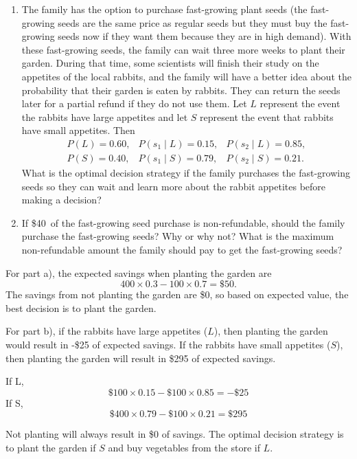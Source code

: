 \begin{enumerate}
\begin{enumerate}
    \item The family has the option to purchase fast-growing plant seeds (the fast-growing seeds are the same price as regular seeds but they must buy the fast-growing seeds now if they want them because they are in high demand).  With these fast-growing seeds, the family can wait three more weeks to plant their garden. During that time, some scientists will finish their study on the appetites of the local rabbits, and the family will have a better idea about the probability that their garden is eaten by rabbits. They can return the seeds later for a partial refund if they do not use them.
    Let $L$ represent the event the rabbits have large appetites and let $S$ represent
    the event that rabbits have small appetites. Then
    \[
    \begin{matrix}
    P(L)=0.60, & P(s_1 \mid L)=0.15, & P(s_2 \mid L)=0.85,\\
    P(S)=0.40, & P(s_1 \mid S)=0.79, & P(s_2 \mid S)=0.21.
    \end{matrix}
    \]
    What is the optimal decision strategy if the family purchases the fast-growing seeds so they can wait and learn more about the rabbit appetites before making a decision?
    
    \item If \$40\ of the fast-growing seed purchase is non-refundable, should the family purchase the fast-growing seeds? Why or why not? What is the maximum non-refundable amount the family should pay to get the fast-growing seeds?
\end{enumerate}

\begin{solution}
\bs For part a), the expected savings when planting the garden are
\[ 400 \times 0.3  - 100 \times 0.7 = \$50. \]
The savings from not planting the garden are \$0, so based on expected value,
the best decision is to plant the garden.

For part b), if the rabbits have large appetites ($L$), then planting 
the garden would result in -\$25 of expected savings.
If the rabbits have small appetites ($S$), then planting the garden will result in \$295 
of expected savings. 

If L, \[ \$100 \times 0.15 - \$100 \times 0.85 = -\$25 \]
If S, \[ \$400 \times 0.79 - \$100 \times 0.21 = \$295 \]

Not planting will always result in \$0 of savings. 
The optimal decision strategy is to plant the garden if $S$ and buy vegetables 
from the store if $L$.


\end{solution}
\end{enumerate}
